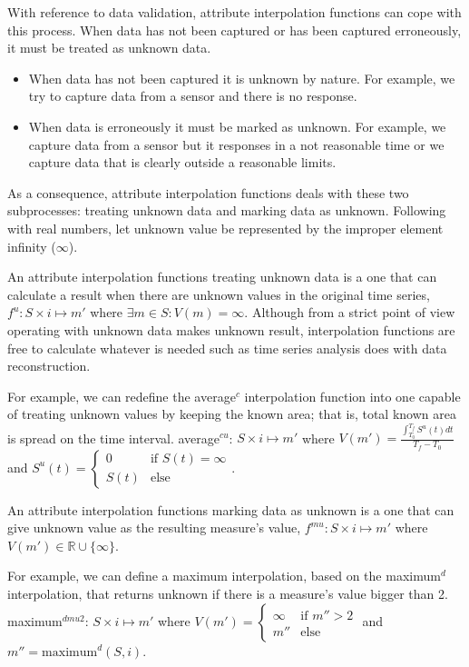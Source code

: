 With reference to data validation, attribute interpolation functions
can cope with this process. When data has not been captured or has
been captured erroneously, it must be treated as unknown data.
\begin{itemize}
\item When data has not been captured it is unknown by nature. For
  example, we try to capture data from a sensor and there is no
  response.
\item When data is erroneously it must be marked as unknown. For
  example, we capture data from a sensor but it responses in a not
  reasonable time or we capture data that is clearly outside a
  reasonable limits.
\end{itemize}
As a consequence, attribute interpolation functions deals with these
two subprocesses: treating unknown data and marking data as
unknown. Following with real numbers, let unknown value be represented
by the improper element infinity ($\infty$).  

An attribute interpolation functions treating unknown data is a one
that can calculate a result when there are unknown values in the
original time series, $f^u: S \times i \mapsto m'$ where $\exists m \in
S: V(m)=\infty$. Although from a strict point of view
operating with unknown data makes unknown result, interpolation
functions are free to calculate whatever is needed such as time series
analysis does with data reconstruction.

For example, we can redefine the average$^{c}$ interpolation function
into one capable of treating unknown values by keeping the known area;
that is, total known area is spread on the time interval.
average$^{cu}$: $S \times i \mapsto m'$ where $V(m') =
\frac{\int_{T_0}^{T_f} S^u(t)dt}{T_f-T_0}$ and $S^u(t)=
\begin{cases}
  0 &\text{if }  S(t)=\infty\\
  S(t) & \text{else }
\end{cases}$.


An attribute interpolation functions marking data as unknown is a one
that can give unknown value as the resulting measure's value, $f^{mu}:
S \times i \mapsto m'$ where $V(m')\in \mathbb{R}\cup\{\infty\}$.

For example, we can define a maximum interpolation, based on the
maximum$^d$ interpolation, that returns unknown if there is a
measure's value bigger than 2.  maximum$^{dmu2}$: $S \times i
\mapsto m'$ where $V(m') = 
\begin{cases}
  \infty &\text{if }  m''>2\\
  m'' & \text{else }
\end{cases}$ and $m''=\text{maximum}^d(S,i)$.

